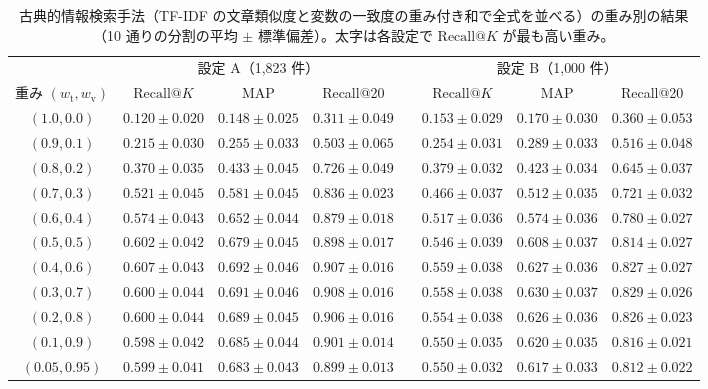 \documentclass[11pt,a4paper]{ltjsarticle}
\makeatletter
\newcommand{\rk}{\textrm{Recall@}K}
\makeatother
\begin{document}
\begin{table}[h]\centering
\small
\caption{古典的情報検索手法（TF-IDF の文章類似度と変数の一致度の重み付き和で全式を並べる）の重み別の結果（10 通りの分割の平均 $\pm$ 標準偏差）。太字は各設定で $\rk$ が最も高い重み。}
\label{tab:weights}
\footnotesize
\setlength{\tabcolsep}{2.5pt}
\begin{tabular}{@{}cccccccc@{}}
\toprule
 & \multicolumn{3}{c}{設定 A（1{,}823 件）} & & \multicolumn{3}{c}{設定 B（1{,}000 件）} \\
\cmidrule{2-4}\cmidrule{6-8}
重み $(w_{\mathrm{t}}, w_{\mathrm{v}})$ & $\rk$ & MAP & Recall@20 & & $\rk$ & MAP & Recall@20 \\
\midrule
$(1.0, 0.0)$ & $0.120 \pm 0.020$ & $0.148 \pm 0.025$ & $0.311 \pm 0.049$ & & $0.153 \pm 0.029$ & $0.170 \pm 0.030$ & $0.360 \pm 0.053$ \\
$(0.9, 0.1)$ & $0.215 \pm 0.030$ & $0.255 \pm 0.033$ & $0.503 \pm 0.065$ & & $0.254 \pm 0.031$ & $0.289 \pm 0.033$ & $0.516 \pm 0.048$ \\
$(0.8, 0.2)$ & $0.370 \pm 0.035$ & $0.433 \pm 0.045$ & $0.726 \pm 0.049$ & & $0.379 \pm 0.032$ & $0.423 \pm 0.034$ & $0.645 \pm 0.037$ \\
$(0.7, 0.3)$ & $0.521 \pm 0.045$ & $0.581 \pm 0.045$ & $0.836 \pm 0.023$ & & $0.466 \pm 0.037$ & $0.512 \pm 0.035$ & $0.721 \pm 0.032$ \\
$(0.6, 0.4)$ & $0.574 \pm 0.043$ & $0.652 \pm 0.044$ & $0.879 \pm 0.018$ & & $0.517 \pm 0.036$ & $0.574 \pm 0.036$ & $0.780 \pm 0.027$ \\
$(0.5, 0.5)$ & $0.602 \pm 0.042$ & $0.679 \pm 0.045$ & $0.898 \pm 0.017$ & & $0.546 \pm 0.039$ & $0.608 \pm 0.037$ & $0.814 \pm 0.027$ \\
$\mathbf{(0.4, 0.6)}$ & $\mathbf{0.607 \pm 0.043}$ & $0.692 \pm 0.046$ & $0.907 \pm 0.016$ & & $\mathbf{0.559 \pm 0.038}$ & $0.627 \pm 0.036$ & $0.827 \pm 0.027$ \\
$(0.3, 0.7)$ & $0.600 \pm 0.044$ & $0.691 \pm 0.046$ & $0.908 \pm 0.016$ & & $0.558 \pm 0.038$ & $0.630 \pm 0.037$ & $0.829 \pm 0.026$ \\
$(0.2, 0.8)$ & $0.600 \pm 0.044$ & $0.689 \pm 0.045$ & $0.906 \pm 0.016$ & & $0.554 \pm 0.038$ & $0.626 \pm 0.036$ & $0.826 \pm 0.023$ \\
$(0.1, 0.9)$ & $0.598 \pm 0.042$ & $0.685 \pm 0.044$ & $0.901 \pm 0.014$ & & $0.550 \pm 0.035$ & $0.620 \pm 0.035$ & $0.816 \pm 0.021$ \\
$(0.05, 0.95)$ & $0.599 \pm 0.041$ & $0.683 \pm 0.043$ & $0.899 \pm 0.013$ & & $0.550 \pm 0.032$ & $0.617 \pm 0.033$ & $0.812 \pm 0.022$ \\

\end{tabular}
\end{table}
\end{document}
